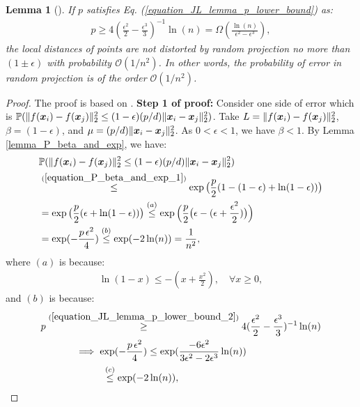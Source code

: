 \documentclass{article}
\newtheorem{lemma}{Lemma}
\def\b{\ensuremath\boldsymbol}
\begin{document}
\begin{lemma}[\cite{dasgupta1999elementary,dasgupta2003elementary}]\label{lemma_prob_success_whp}
If $p$ satisfies Eq. (\ref{equation_JL_lemma_p_lower_bound}) as:
\begin{align}\label{equation_JL_lemma_p_lower_bound_2}
p \geq 4(\frac{\epsilon^2}{2} - \frac{\epsilon^3}{3})^{-1} \ln(n) = \Omega(\frac{\ln(n)}{\epsilon^2 - \epsilon^3}),
\end{align}
the local distances of points are not distorted by random projection no more than $(1 \pm \epsilon)$ with probability $\mathcal{O}(1/n^2)$. In other words, the probability of error in random projection is of the order $\mathcal{O}(1/n^2)$.
\end{lemma}
\begin{proof}
The proof is based on \cite{dasgupta2003elementary}.
\hfill\break
\textbf{Step 1 of proof:}
Consider one side of error which is $\mathbb{P}(\|f(\b{x}_i) - f(\b{x}_j)\|_2^2 \leq (1-\epsilon) (p/d) \|\b{x}_i - \b{x}_j\|_2^2)$. Take $L = \|f(\b{x}_i) - f(\b{x}_j)\|_2^2$, $\beta = (1-\epsilon)$, and $\mu = (p/d) \|\b{x}_i - \b{x}_j\|_2^2$. As $0 < \epsilon < 1$, we have $\beta<1$. By Lemma \ref{lemma_P_beta_and_exp}, we have:
\begin{align}
&\mathbb{P}(\|f(\b{x}_i) - f(\b{x}_j)\|_2^2 \leq (1-\epsilon) (p/d) \|\b{x}_i - \b{x}_j\|_2^2) \nonumber\\
&\overset{(\ref{equation_P_beta_and_exp_1})}{\leq} \exp\big(\frac{p}{2} (1 - (1-\epsilon) + \ln (1-\epsilon))\big) \nonumber\\
&= \exp\big(\frac{p}{2} (\epsilon + \ln (1-\epsilon))\big) \overset{(a)}{\leq} \exp\Big(\frac{p}{2} \big(\epsilon - (\epsilon + \frac{\epsilon^2}{2})\big)\Big) \nonumber\\
&= \exp(-\frac{p\, \epsilon^2}{4}) \overset{(b)}{\leq} \exp(-2 \ln(n)) = \frac{1}{n^2},
\end{align}
where $(a)$ is because:
\begin{align*}
\ln(1-x) \leq -(x + \frac{x^2}{2}), \quad \forall x \geq 0,
\end{align*}
and $(b)$ is because:
\begin{align*}
&p \overset{(\ref{equation_JL_lemma_p_lower_bound_2})}{\geq} 4(\frac{\epsilon^2}{2} - \frac{\epsilon^3}{3})^{-1} \ln(n) \\
&~~~~~~~~~~ \implies \exp(-\frac{p\, \epsilon^2}{4}) \leq \exp(\frac{-6 \epsilon^2}{3\epsilon^2 - 2\epsilon^3} \ln(n)) \\
&~~~~~~~~~~~~~~~~~~~\overset{(c)}{\leq} \exp(-2 \ln(n)),

\end{align*}
\end{proof}
\end{document}
